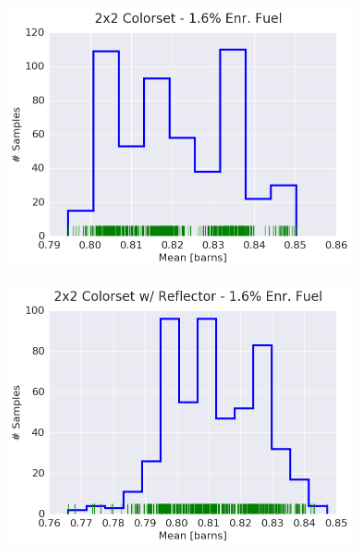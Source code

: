 \begin{figure}[h!]
\begin{subfigure}{0.5\textwidth}
  \centering
  \includegraphics[width=\linewidth]{figures/patterns/2x2/hist-kde-rug/16-enr-capt-1}
  \caption{}
  \label{fig:chap9-hist-2x2-1.6-capt}
\end{subfigure}%
\begin{subfigure}{0.5\textwidth}
  \centering
  \includegraphics[width=\linewidth]{figures/patterns/reflector/hist-kde-rug/16-enr-capt-1}  \caption{}
  \label{fig:chap9-hist-reflector-1.6-capt}
\end{subfigure}
\begin{subfigure}{0.5\textwidth}
  \centering

\end{subfigure}
\end{figure}
